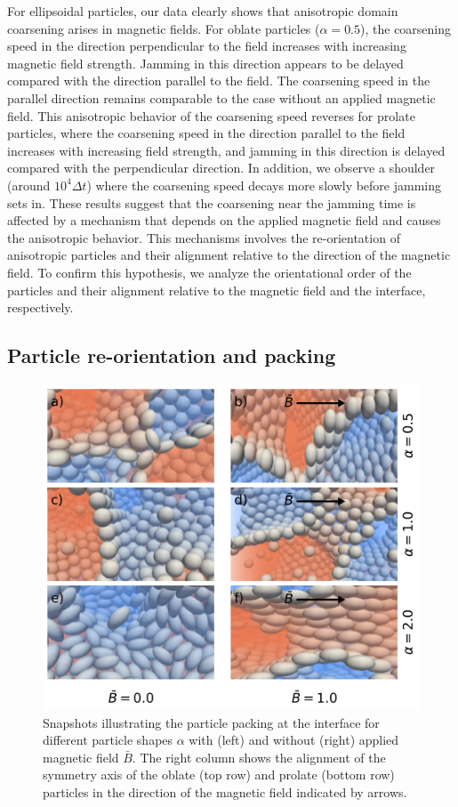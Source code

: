 For ellipsoidal particles, our data clearly shows that an\-isotropic
domain coarsening arises in magnetic fields.  For oblate particles
(\(\alpha=0.5\)), the coarsening speed in the direction perpendicular
to the field increases with increasing magnetic field strength.
Jamming in this direction appears to be delayed compared with the
direction parallel to the field. The coarsening speed in the parallel
direction remains comparable to the case without an applied magnetic
field. This anisotropic behavior of the coarsening speed reverses for
prolate particles, where the coarsening speed in the direction parallel to the field increases with increasing field strength, and jamming in this direction
is delayed compared with the perpendicular direction. In addition, we observe a shoulder (around \(10^4\Delta t\)) where the coarsening speed decays more slowly before jamming sets in. These results suggest that the coarsening near the jamming time is affected by a mechanism that depends on the applied magnetic field and causes the anisotropic
behavior. This mechanisms involves the re-orientation of anisotropic
particles and their alignment relative to the direction of the
magnetic field. To confirm this hypothesis, we analyze the
orientational order of the particles and their alignment relative to
the magnetic field and the interface, respectively.

\subsection{Particle re-orientation and packing}

\begin{figure}
\centering
\includegraphics[width=\columnwidth]{figures/results/paper1/particle_packing_viz.png}
\caption{Snapshots illustrating the particle packing at the interface for different particle shapes $\alpha$ with (left) and without (right) applied magnetic field $\bar{B}$. The right column shows the alignment of the symmetry axis of the oblate (top row) and prolate (bottom row) particles in the direction of the magnetic field indicated by arrows.}
\label{fig:packing_viz}
\end{figure}


